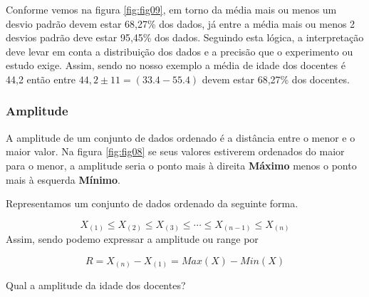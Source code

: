 \documentclass[12pt,]{style/krantz}
\makeatletter
\newenvironment{Shaded}{\begin{snugshade}}{\end{snugshade}}
\newcommand{\CommentTok}[1]{\textcolor[rgb]{0.56,0.35,0.01}{\textit{#1}}}
\newcommand{\DataTypeTok}[1]{\textcolor[rgb]{0.13,0.29,0.53}{#1}}
\newcommand{\DecValTok}[1]{\textcolor[rgb]{0.00,0.00,0.81}{#1}}
\newcommand{\KeywordTok}[1]{\textcolor[rgb]{0.13,0.29,0.53}{\textbf{#1}}}
\newcommand{\NormalTok}[1]{#1}
\newcommand{\OperatorTok}[1]{\textcolor[rgb]{0.81,0.36,0.00}{\textbf{#1}}}
\newcommand{\OtherTok}[1]{\textcolor[rgb]{0.56,0.35,0.01}{#1}}
\newcommand{\StringTok}[1]{\textcolor[rgb]{0.31,0.60,0.02}{#1}}
\newenvironment{kframe}{%
\medskip{}
\setlength{\fboxsep}{.8em}
 \def\at@end@of@kframe{}%
 \ifinner\ifhmode%
  \def\at@end@of@kframe{\end{minipage}}%
  \begin{minipage}{\columnwidth}%
 \fi\fi%
 \def\FrameCommand##1{\hskip\@totalleftmargin \hskip-\fboxsep
 \colorbox{shadecolor}{##1}\hskip-\fboxsep
     \hskip-\linewidth \hskip-\@totalleftmargin \hskip\columnwidth}%
 \MakeFramed {\advance\hsize-\width
   \@totalleftmargin\z@ \linewidth\hsize
   \@setminipage}}%
 {\par\unskip\endMakeFramed%
 \at@end@of@kframe}
\renewenvironment{Shaded}{\begin{kframe}}{\end{kframe}}
\theoremstyle{definition}
\theoremstyle{definition}
\theoremstyle{definition}
\theoremstyle{remark}
\let\BeginKnitrBlock\begin \let\EndKnitrBlock\end
\makeatother
\begin{document}
Conforme vemos na figura \ref{fig:fig09}, em torno da média mais ou menos um desvio padrão devem estar 68,27\% dos dados, já entre a média mais ou menos 2 desvios padrão deve estar 95,45\% dos dados. Seguindo esta lógica, a interpretação deve levar em conta a distribuição dos dados e a precisão que o experimento ou estudo exige. Assim, sendo no nosso exemplo a média de idade dos docentes é 44,2 então entre \(44,2 \pm 11 = (33.4-55.4)\) devem estar 68,27\% dos docentes.

\hypertarget{amplitude}{%
\subsubsection{Amplitude}\label{amplitude}}

A amplitude de um conjunto de dados ordenado é a distância entre o menor e o maior valor. Na figura \ref{fig:fig08} se seus valores estiverem ordenados do maior para o menor, a amplitude seria o ponto mais à direita \textbf{Máximo} menos o ponto mais à esquerda \textbf{Mínimo}.

Representamos um conjunto de dados ordenado da seguinte forma.

\[X_{(1)}\leq X_{(2)}\leq X_{(3)}\leq \cdots \leq X_{(n-1)}\leq X_{(n)}\]
Assim, sendo podemo expressar a amplitude ou range por

\[R = X_{(n)} - X_{(1)} = Max(X) - Min(X)\]

\BeginKnitrBlock{example}
\protect\hypertarget{exm:unnamed-chunk-49}{}{\label{exm:unnamed-chunk-49} }Qual a amplitude da idade dos docentes?
\EndKnitrBlock{example}

\begin{Shaded}
\end{Shaded}
\end{document}
